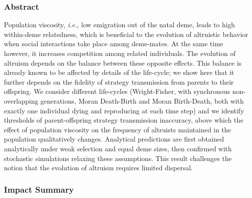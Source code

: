 \documentclass[11pt, letterpaper]{article}
\newcommand{\ie}{\textit{i.e.}}
\begin{document}

\linenumbers
\subsubsection*{Abstract}
\doublespacing
Population viscosity, \ie, low emigration out of the natal deme, leads to high within-deme relatedness, which is beneficial to the evolution of altruistic behavior when social interactions take place among deme-mates. At the same time however, it increases competition among related individuals. The evolution of altruism depends on the balance between these opposite effects. This balance is already known to be affected by details of the life-cycle; we show here that it further depends on the fidelity of strategy transmission from parents to their offspring. We consider different life-cycles (Wright-Fisher, with synchronous non-overlapping generations, Moran Death-Birth and Moran Birth-Death, both with exactly one individual dying and reproducing at each time step) and we identify thresholds of parent-offspring strategy transmission inaccuracy, above which the effect of population viscosity on the frequency of altruists maintained in the population qualitatively changes. Analytical predictions are first obtained analytically under weak selection and equal deme sizes, then confirmed with stochastic simulations relaxing these assumptions. This result challenges the notion that the evolution of altruism requires limited dispersal. 

\clearpage
\subsubsection*{Impact Summary}
\end{document}
